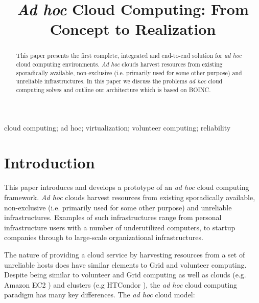 \documentclass[10pt, conference, compsocconf]{IEEEtran}
\begin{document}
\title{\textit{Ad hoc} Cloud Computing: From Concept to Realization}




\author{
}

\maketitle

\begin{abstract}
This paper presents the first complete, integrated and end-to-end solution for \textit{ad hoc} cloud computing environments. \textit{Ad hoc} clouds harvest resources from existing sporadically available, non-exclusive (i.e. primarily used for some other purpose) and unreliable infrastructures. In this paper we discuss the problems \textit{ad hoc} cloud computing solves and outline our architecture which is based on BOINC.

\end{abstract}

\begin{IEEEkeywords}
cloud computing; ad hoc; virtualization; volunteer computing; reliability
\end{IEEEkeywords}

\IEEEpeerreviewmaketitle

\section{Introduction}
This paper introduces and develops a prototype of an \textit{ad hoc} cloud computing framework. \textit{Ad hoc} clouds harvest resources from existing sporadically available, non-exclusive (i.e. primarily used for some other purpose) and unreliable infrastructures. Examples of such infrastructures range from personal infrastructure users with a number of underutilized computers, to startup companies through to large-scale organizational infrastructures. 

The nature of providing a cloud service by harvesting resources from a set of unreliable hosts does have similar elements to Grid and volunteer computing. Despite being similar to volunteer and Grid computing as well as clouds (e.g. Amazon EC2 \cite{amazon_ec2}) and clusters (e.g HTCondor \cite{Thain2005}), the \textit{ad hoc} cloud computing paradigm has many key differences. The \textit{ad hoc} cloud model:
\end{document}
